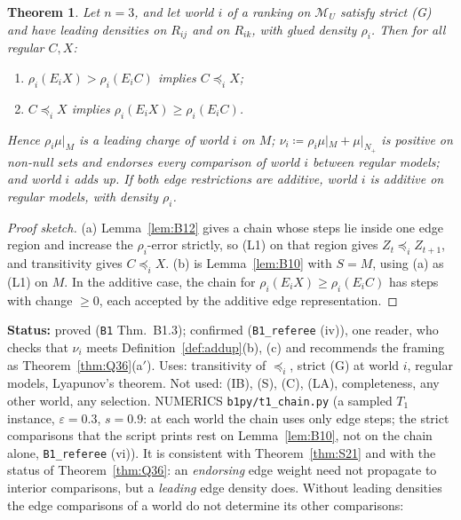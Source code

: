 \documentclass[11pt]{article}
\newtheorem{theorem}{Theorem}[section]
\theoremstyle{definition}
\theoremstyle{remark}
\newcommand{\M}{\mathcal M}
\newcommand{\src}[1]{\texttt{#1}}
\newcommand{\status}[1]{\par\smallskip\noindent\textbf{Status:} #1\par\smallskip}
\begin{document}
\begin{theorem}\label{thm:B13}
Let $n=3$, and let world $i$ of a ranking on $\M_U$ satisfy strict (G) and have leading densities on $R_{ij}$ and on $R_{ik}$, with glued density $\rho_i$. Then for all regular $C,X$:
\begin{enumerate}[leftmargin=*,label=(\alph*)]
\item $\rho_i(E_iX)>\rho_i(E_iC)$ implies $C\preceq_iX$;
\item $C\preceq_iX$ implies $\rho_i(E_iX)\ge\rho_i(E_iC)$.
\end{enumerate}
Hence $\rho_i\mu|_M$ is a leading charge of world $i$ on $M$; $\nu_i\coloneqq\rho_i\mu|_M+\mu|_{N_+}$ is positive on non-null sets and endorses every comparison of world $i$ between regular models; and world $i$ adds up. If both edge restrictions are additive, world $i$ is additive on regular models, with density $\rho_i$.
\end{theorem}
\begin{proof}[Proof sketch]
(a) Lemma~\ref{lem:B12} gives a chain whose steps lie inside one edge region and increase the $\rho_i$-error strictly, so (L1) on that region gives $Z_t\preceq_iZ_{t+1}$, and transitivity gives $C\preceq_iX$. (b) is Lemma~\ref{lem:B10} with $S=M$, using (a) as (L1) on $M$. In the additive case, the chain for $\rho_i(E_iX)\ge\rho_i(E_iC)$ has steps with change $\ge0$, each accepted by the additive edge representation.
\end{proof}
\status{proved (\src{B1} Thm.~B1.3); confirmed (\src{B1\_referee} (iv)), one reader, who checks that $\nu_i$ meets Definition~\ref{def:addup}(b), (c) and recommends the framing as Theorem~\ref{thm:Q36}(a$'$). Uses: transitivity of $\preceq_i$, strict (G) at world $i$, regular models, Lyapunov's theorem. Not used: (IB), (S), (C), (LA), completeness, any other world, any selection. NUMERICS \src{b1py/t1\_chain.py} (a sampled $T_1$ instance, $\varepsilon=0.3$, $s=0.9$: at each world the chain uses only edge steps; the strict comparisons that the script prints rest on Lemma~\ref{lem:B10}, not on the chain alone, \src{B1\_referee} (vi)). It is consistent with Theorem~\ref{thm:S21} and with the status of Theorem~\ref{thm:Q36}: an \emph{endorsing} edge weight need not propagate to interior comparisons, but a \emph{leading} edge density does. Without leading densities the edge comparisons of a world do not determine its other comparisons:}
\end{document}
